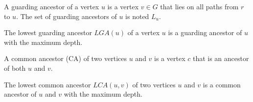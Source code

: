 \begin{definition}
	A guarding ancestor of a vertex $u$ is a vertex $v \in G$ that lies on all paths from $r$ to $u$.
	The set of guarding ancestors of $u$ is noted $L_u$.
\end{definition}

\begin{definition}
	The lowest guarding ancestor $LGA(u)$ of a vertex $u$ is a guarding ancestor of $u$ with the maximum depth.
\end{definition}





\begin{definition} \label{def:commonAncestor}
	A common ancestor (CA) of two vertices $u$ and $v$ is a vertex $c$ that is an ancestor of both $u$ and $v$.
\end{definition}

\begin{definition} \label{def:LowestCommonAncestor}
	The lowest common ancestor $LCA(u,v)$ of two vertices $u$ and $v$ is a common ancestor of $u$ and $v$ with the maximum depth.
\end{definition}



